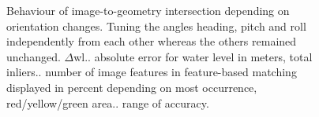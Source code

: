 \documentclass[review]{elsarticle}
\begin{document}
\begin{figure}[htbp!]
\begin{center}
	 	\begin{minipage}{\columnwidth}
	 		\centering
	 	\end{minipage}
	 	\begin{minipage}{\columnwidth}
	 		\centering
	 	\end{minipage}
		\begin{minipage}{\columnwidth} 
	 		\centering
	 	\end{minipage}
	\caption{Behaviour of image-to-geometry intersection depending on orientation changes. Tuning the angles heading, pitch and roll independently from each other whereas the others remained unchanged. ${\Delta}$wl.. absolute error for water level in meters, total inliers.. number of image features in feature-based matching displayed in percent depending on most occurrence, red/yellow/green area.. range of accuracy.}
	\label{fig:sensor_sensi}
\end{center}
\end{figure}
\end{document}
